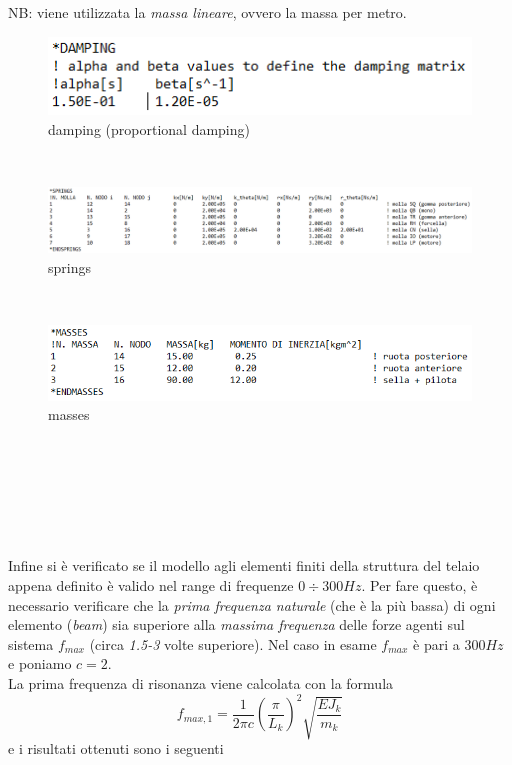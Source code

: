 \documentclass[12pt, a4paper]{article}
\begin{document}
	NB: viene utilizzata la \textit{massa lineare}, ovvero la massa per metro.\\ 
	\begin{figure}[h]
		\centering
		\includegraphics[scale=0.8]{Damping}
		\caption{damping (proportional damping)}
	\end{figure}\\ 
	\begin{figure}[h]
		\centering
		\includegraphics[scale=0.55]{Springs}
		\caption{springs}
	\end{figure}\\
	\begin{figure}[h]
		\centering
		\includegraphics[scale=0.8]{Masses}
		\caption{masses}
	\end{figure}\\\\\\\\\\\\
	Infine si è verificato se il modello agli elementi finiti della struttura del telaio appena definito è valido nel range di frequenze $0\div300Hz$. Per fare questo, è necessario verificare che la \textit{prima frequenza naturale} (che è la più bassa) di ogni elemento (\textit{beam}) sia superiore alla \textit{massima frequenza} delle forze agenti sul sistema $f_{max}$ (circa \textit{1.5-3} volte superiore). Nel caso in esame $f_{max}$ è pari a $300Hz$ e poniamo $c=2$.\\
	La prima frequenza di risonanza viene calcolata con la formula
	\[f_{max,1}=\frac{1}{2 \pi c}(\frac{\pi}{L_{k}})^{2}\sqrt{\frac{E J_{k}}{m_{k}}}\]
	e i risultati ottenuti sono i seguenti 
\end{document}
